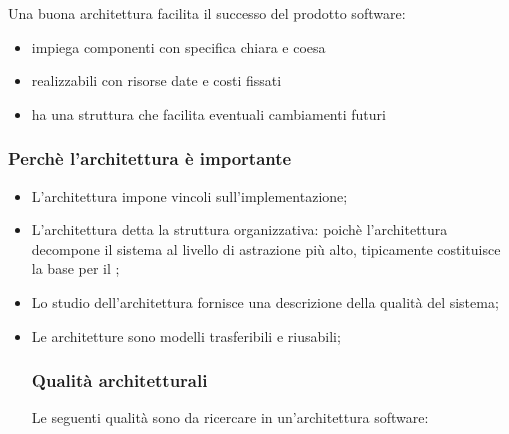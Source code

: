 Una buona architettura facilita il successo del prodotto software:

\begin{itemize}
  \item impiega componenti con specifica chiara e coesa
  \item realizzabili con risorse date e costi fissati
  \item ha una struttura che facilita eventuali cambiamenti futuri
\end{itemize}

\subsubsection{Perchè l'architettura è importante}

\begin{itemize}
  \item L'architettura impone vincoli sull'implementazione;
  \item L'architettura detta la struttura organizzativa: poichè l'architettura
    decompone il sistema al livello di astrazione più alto, tipicamente
    costituisce la base per il ;
  \item Lo studio dell'architettura fornisce una descrizione della qualità del
    sistema;
  \item Le architetture sono modelli trasferibili e riusabili;

\subsubsection{Qualità architetturali}

Le seguenti qualità sono da ricercare in un'architettura software:


\end{itemize}
